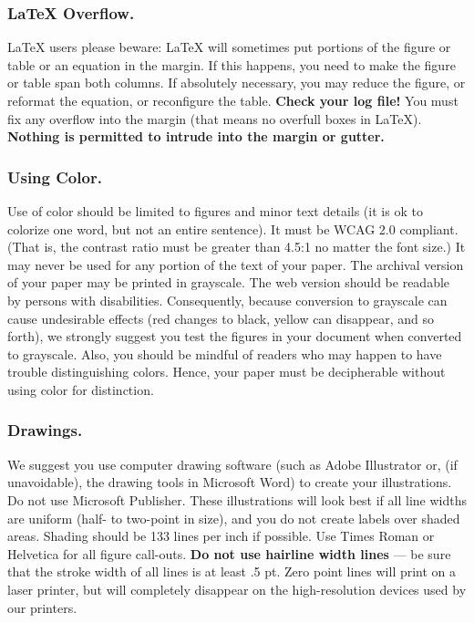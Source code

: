 \subsubsection{\LaTeX{} Overflow.}
\LaTeX{} users please beware: \LaTeX{} will sometimes put portions of the figure or table or an equation in the margin. If this happens, you need to make the figure or table span both columns. If absolutely necessary, you may reduce the figure, or reformat the equation, or reconfigure the table.{ \bf Check your log file!} You must fix any overflow into the margin (that means no overfull boxes in \LaTeX{}). \textbf{Nothing is permitted to intrude into the margin or gutter.}


\subsubsection{Using Color.}
Use of color should be limited to figures and minor text details (it is ok to colorize one word, but not an entire sentence). It must be WCAG 2.0 compliant. (That is, the contrast ratio must be greater than 4.5:1 no matter the font size.) It may never be used for any portion of the text of your paper. The archival version of your paper may be printed in grayscale. The web version should be readable by persons with disabilities. Consequently, because conversion to grayscale can cause undesirable effects (red changes to black, yellow can disappear, and so forth), we strongly suggest you test the figures in your document when converted to grayscale. Also, you should be mindful of readers who may happen to have trouble distinguishing colors. Hence, your paper must be decipherable without using color for distinction.

\subsubsection{Drawings.}
We suggest you use computer drawing software (such as Adobe Illustrator or, (if unavoidable), the drawing tools in Microsoft Word) to create your illustrations. Do not use Microsoft Publisher. These illustrations will look best if all line widths are uniform (half- to two-point in size), and you do not create labels over shaded areas. Shading should be 133 lines per inch if possible. Use Times Roman or Helvetica for all figure call-outs. \textbf{Do not use hairline width lines} --- be sure that the stroke width of all lines is at least .5 pt. Zero point lines will print on a laser printer, but will completely disappear on the high-resolution devices used by our printers.

